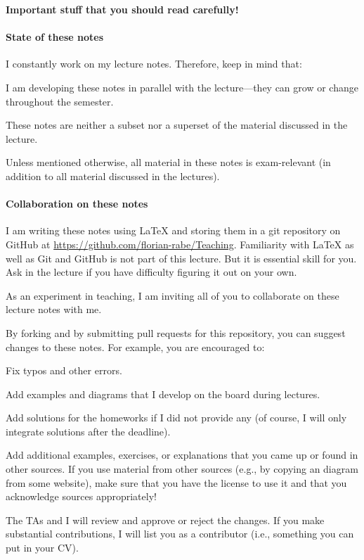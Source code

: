 \begin{center}
\textbf{Important stuff that you should read carefully!}
\end{center}

\paragraph{State of these notes}
I constantly work on my lecture notes.
Therefore, keep in mind that:
\begin{compactitem}
\item I am developing these notes in parallel with the lecture---they can grow or change throughout the semester.
\item These notes are neither a subset nor a superset of the material discussed in the lecture.
\item Unless mentioned otherwise, all material in these notes is exam-relevant (in addition to all material discussed in the lectures).
\end{compactitem}
\medskip

\paragraph{Collaboration on these notes}
I am writing these notes using LaTeX and storing them in a git repository on GitHub at \url{https://github.com/florian-rabe/Teaching}.
Familiarity with LaTeX as well as Git and GitHub is not part of this lecture. But it is essential skill for you.
Ask in the lecture if you have difficulty figuring it out on your own.
\medskip

As an experiment in teaching, I am inviting all of you to collaborate on these lecture notes with me.
\medskip

By forking and by submitting pull requests for this repository, you can suggest changes to these notes.
For example, you are encouraged to:
\begin{compactitem}
\item Fix typos and other errors.
\item Add examples and diagrams that I develop on the board during lectures.
\item Add solutions for the homeworks if I did not provide any (of course, I will only integrate solutions after the deadline).
\item Add additional examples, exercises, or explanations that you came up or found in other sources.
 If you use material from other sources (e.g., by copying an diagram from some website), make sure that you have the license to use it and that you acknowledge sources appropriately!
\end{compactitem}
The TAs and I will review and approve or reject the changes.
If you make substantial contributions, I will list you as a contributor (i.e., something you can put in your CV).
\medskip


